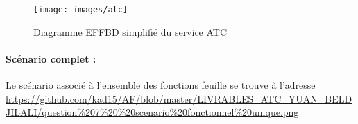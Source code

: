     	\begin{figure}[H]
    	\begin{center}	
    		\texttt{[image: images/atc]}
    		\caption{Diagramme EFFBD simplifié du service ATC}
    		\label{atc}
    	\end{center}
    \end{figure}
    
    \paragraph{Scénario complet : }
     Le scénario associé à l'ensemble des fonctions feuille se trouve à l'adresse  \url{https://github.com/kad15/AF/blob/master/LIVRABLES_ATC_YUAN_BELDJILALI/question%207%20%20scenario%20fonctionnel%20unique.png}
    	